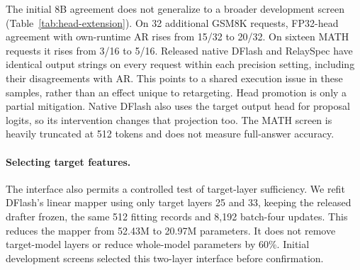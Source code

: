 \documentclass{article}
\begin{document}
\begin{table}[H]
\centering\small

\caption{Output-head precision with a BF16 transformer. Own AR uses the
same runtime as RelaySpec. FP32 AR runs the entire model in FP32 and
is a distinct reference. Rates concern the same questions but can time
different outputs across precision settings.}
\label{tab:head-precision}
\end{table}


The initial 8B agreement does not generalize to a broader development
screen (Table~\ref{tab:head-extension}). On 32 additional GSM8K requests,
FP32-head agreement with own-runtime AR rises from 15/32 to 20/32.
On sixteen MATH requests it rises from 3/16 to 5/16. Released native
DFlash and RelaySpec have identical output strings on every request
within each precision setting, including their disagreements with AR.
This points to a shared execution issue in these samples, rather than
an effect unique to retargeting. Head promotion is only a partial
mitigation. Native DFlash also uses the target output head for proposal
logits, so its intervention changes that projection too. The MATH
screen is heavily truncated at 512 tokens and does not measure
full-answer accuracy.

\begin{table}[H]
\centering\small

\caption{Broader 8B head-precision diagnostic. Matches compare complete
recorded token sequences with each runtime's own AR, including capped
sequences. MATH AR reaches the cap on 11/16 requests in both settings.
Native and RelaySpec reach it on 11/16 in BF16 and 10/16 with the FP32
head. One GSM8K request is capped for every method in both settings.}
\label{tab:head-extension}
\end{table}

\begin{table}[H]
\centering\small

\caption{Downward retargeting to Qwen3-0.6B on 16 GSM8K requests.
Timing includes prompt processing. Correctness and exact AR-output
matches are separate. The duplicate row repeats the same checkpoint
and passes the trajectory-equivalence check. All models run in BF16.}
\label{tab:downscale}
\end{table}

\paragraph{Selecting target features.}
\label{app:interface-compression}
The interface also permits a controlled test of target-layer sufficiency.
We refit DFlash's linear mapper using only target layers 25 and 33,
keeping the released drafter frozen, the same 512 fitting records and
8,192 batch-four updates. This reduces the mapper from 52.43M to
20.97M parameters. It does not remove target-model layers or reduce
whole-model parameters by 60\%. Initial development screens selected
this two-layer interface before confirmation.
\end{document}
